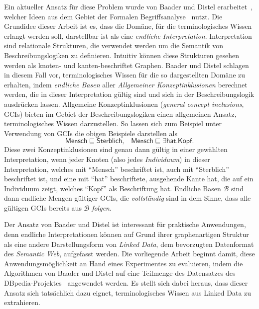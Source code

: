 \documentclass[ngerman,fleqn,DIV=12]{scrartcl}
\begin{document}
Ein aktueller Ansatz für diese Problem wurde von Baader und Distel
erarbeitet~\cite{Diss-Felix}, welcher Ideen aus dem Gebiet der Formalen
Begriffsanalyse~\cite{fca-book} nutzt.  Die Grundidee dieser Arbeit ist es, dass die
Domäne, für die terminologisches Wissen erlangt werden soll, darstellbar ist als eine
\emph{endliche Interpretation}.  Interpretation sind relationale Strukturen, die verwendet
werden um die Semantik von Beschreibungslogiken zu definieren.  Intuitiv können diese
Strukturen gesehen werden als knoten- und kanten-beschriftet Graphen.  Baader und Distel
schlagen in diesem Fall vor, terminologisches Wissen für die so dargestellten Domäne zu
erhalten, indem \emph{endliche Basen} aller \emph{Allgemeiner Konzeptinklusionen}
berechnet werden, die in dieser Interpretation gültig sind und sich in der
Beschreibungslogik \ELbot ausdrücken lassen.  Allgemeine Konzeptinklusionen (\emph{general
  concept inclusions}, GCIs) bieten im Gebiet der Beschreibungslogiken einen allgemeinen
Ansatz, terminologisches Wissen darzustellen.  So lassen sich zum Beispiel unter
Verwendung von GCIs die obigen Beispiele darstellen als
\begin{equation*}
  \mathsf{Mensch} \sqsubseteq \mathsf{Sterblich}, \;\;\; \mathsf{Mensch} \sqsubseteq \exists
  \mathsf{hat}. \mathsf{Kopf}.
\end{equation*}
Diese zwei Konzeptinklusionen sind genau dann gültig in einer gewählten Interpretation,
wenn jeder Knoten (also jedes \emph{Individuum}) in dieser Interpretation, welches mit
\enquote{\textsf{Mensch}} beschriftet ist, auch mit \enquote{\textsf{Sterblich}}
beschriftet ist, und eine mit \enquote{\textsf{hat}} beschriftete, ausgehende Kante hat,
die auf ein Individuum zeigt, welches \enquote{\textsf{Kopf}} als Beschriftung hat.
Endliche Basen $\mathcal{B}$ sind dann endliche Mengen gültiger GCIs, die
\emph{vollständig} sind in dem Sinne, dass alle gültigen GCIs bereits aus $\mathcal{B}$
\emph{folgen}.

Der Ansatz von Baader und Distel ist interessant für praktische Anwendungen, denn endliche
Interpretationen können auf Grund ihrer graphenartigen Struktur als eine andere
Darstellungsform von \emph{Linked Data}, dem bevorzugten Datenformat des \emph{Semantic
  Web}, aufgefasst werden.  Die vorliegende Arbeit beginnt damit, diese
Anwendungsmöglichkeit an Hand eines Experimentes zu evaluieren, indem die Algorithmen von
Baader und Distel auf eine Teilmenge des Datensatzes des DBpedia-Projektes~\cite{DBpedia}
angewendet werden.  Es stellt sich dabei heraus, dass dieser Ansatz sich tatsächlich dazu
eignet, terminologisches Wissen aus Linked Data zu extrahieren.
\end{document}
